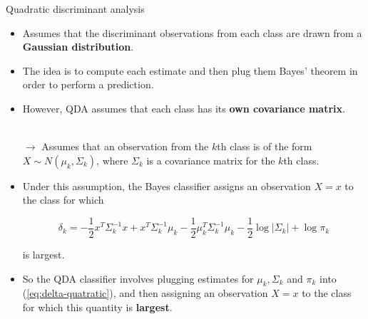 \begin{frame}{Quadratic discriminant analysis}
    \begin{itemize}
        \item Assumes that the discriminant observations from each class are drawn from a \textbf{Gaussian distribution}. \pause 
        
        \item The idea is to compute each estimate and then plug them Bayes' theorem in order to perform a prediction. \pause 

        \item However, QDA assumes that each class has its \textbf{own covariance matrix}. \pause 
        
        \\ $\rightarrow$ Assumes that an observation from the $k$th class is of the form $X \sim N (\mu_k , \Sigma_k )$, where $\Sigma_k$ is a covariance matrix for the $k$th class. \pause 

        \item Under this assumption, the Bayes classifier assigns an observation $X = x$ to the class for which \pause 

        \begin{equation}\label{eq:delta-quatratic}
            \delta_k = - \frac{1}{2} x^T \Sigma_{k}^{-1} x + x^T \Sigma_{k}^{-1} \mu_k - \frac{1}{2} \mu_k^T \Sigma_{k}^{-1} \mu_k - \frac{1}{2} \log{|\Sigma_{k}|} + \log{\pi_k}
       \end{equation} 

       is largest. \pause 

        \item So the QDA classifier involves plugging estimates for $\mu_k , \Sigma_k$ and $\pi_k$ into (\ref{eq:delta-quatratic}), and then assigning an observation $X = x$ to the class for which this quantity is \textbf{largest}.
        
    \end{itemize}
\end{frame}

